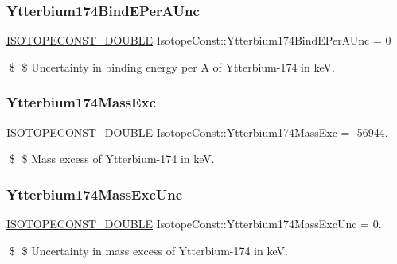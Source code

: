 \subsubsection{\texorpdfstring{Ytterbium174\+Bind\+E\+Per\+A\+Unc}{Ytterbium174BindEPerAUnc}}
{\footnotesize\ttfamily \mbox{\hyperlink{group___isotope_const-_macros_ga8f45a7272ce02c0b4c65c44636ed719a}{I\+S\+O\+T\+O\+P\+E\+C\+O\+N\+S\+T\+\_\+\+D\+O\+U\+B\+LE}} Isotope\+Const\+::\+Ytterbium174\+Bind\+E\+Per\+A\+Unc = 0}

\$ \$ Uncertainty in binding energy per A of Ytterbium-\/174 in keV. \mbox{\label{group___isotope_const-_ytterbium-_yb174_gaf41e71d62661303bf7c02c56a58d97f1}} 
\subsubsection{\texorpdfstring{Ytterbium174\+Mass\+Exc}{Ytterbium174MassExc}}
{\footnotesize\ttfamily \mbox{\hyperlink{group___isotope_const-_macros_ga8f45a7272ce02c0b4c65c44636ed719a}{I\+S\+O\+T\+O\+P\+E\+C\+O\+N\+S\+T\+\_\+\+D\+O\+U\+B\+LE}} Isotope\+Const\+::\+Ytterbium174\+Mass\+Exc = -\/56944.}

\$ \$ Mass excess of Ytterbium-\/174 in keV. \mbox{\label{group___isotope_const-_ytterbium-_yb174_gafb8132dc217be192a1072f5694ee9e7b}} 
\subsubsection{\texorpdfstring{Ytterbium174\+Mass\+Exc\+Unc}{Ytterbium174MassExcUnc}}
{\footnotesize\ttfamily \mbox{\hyperlink{group___isotope_const-_macros_ga8f45a7272ce02c0b4c65c44636ed719a}{I\+S\+O\+T\+O\+P\+E\+C\+O\+N\+S\+T\+\_\+\+D\+O\+U\+B\+LE}} Isotope\+Const\+::\+Ytterbium174\+Mass\+Exc\+Unc = 0.}

\$ \$ Uncertainty in mass excess of Ytterbium-\/174 in keV. \mbox{\label{group___isotope_const-_ytterbium-_yb174_ga846a74587b14c6cae03c62ad4a2b102d}} 
